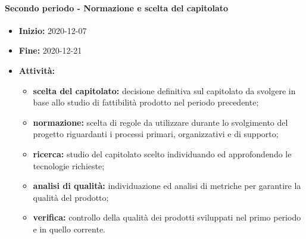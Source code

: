 \paragraph[Secondo periodo]{Secondo periodo - \textnormal{Normazione e scelta del capitolato}}
\begin{itemize}
    \item [] \textbf{Inizio:} 2020-12-07
    \item [] \textbf{Fine:} 2020-12-21
    \item [] \textbf{Attività:}
          \begin{itemize}
              \item \textbf{scelta del capitolato:} decisione definitiva sul capitolato da svolgere in base allo studio di fattibilità prodotto nel periodo precedente;
              \item \textbf{normazione:} scelta di regole da utilizzare durante lo svolgimento del progetto riguardanti i processi primari, organizzativi e di supporto;
              \item \textbf{ricerca:} studio del capitolato scelto individuando ed approfondendo le tecnologie richieste;
              \item \textbf{analisi di qualità:} individuazione ed analisi di metriche per garantire la qualità del prodotto;
              \item \textbf{verifica:} controllo della qualità dei prodotti sviluppati nel primo periodo e in quello corrente.
          \end{itemize}
\end{itemize}

